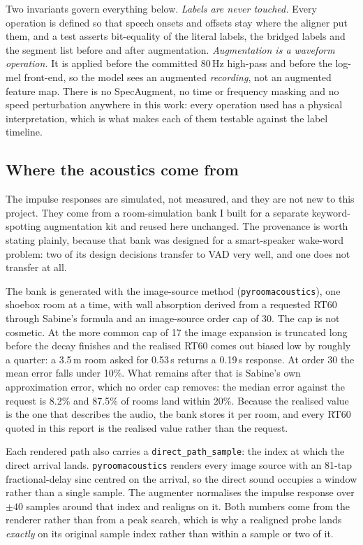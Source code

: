 \documentclass{article}
\begin{document}
Two invariants govern everything below. \emph{Labels are never touched.} Every operation is defined so that speech onsets and offsets stay where the aligner put them, and a test asserts bit-equality of the literal labels, the bridged labels and the segment list before and after augmentation. \emph{Augmentation is a waveform operation.} It is applied before the committed 80\,Hz high-pass and before the log-mel front-end, so the model sees an augmented \emph{recording}, not an augmented feature map. There is no SpecAugment, no time or frequency masking and no speed perturbation anywhere in this work: every operation used has a physical interpretation, which is what makes each of them testable against the label timeline.

\subsection{Where the acoustics come from}

The impulse responses are simulated, not measured, and they are not new to this project. They come from a room-simulation bank I built for a separate keyword-spotting augmentation kit and reused here unchanged. The provenance is worth stating plainly, because that bank was designed for a smart-speaker wake-word problem: two of its design decisions transfer to VAD very well, and one does not transfer at all.

The bank is generated with the image-source method (\texttt{pyroomacoustics}), one shoebox room at a time, with wall absorption derived from a requested RT60 through Sabine's formula and an image-source order cap of 30. The cap is not cosmetic. At the more common cap of 17 the image expansion is truncated long before the decay finishes and the realised RT60 comes out biased low by roughly a quarter: a 3.5\,m room asked for 0.53\,s returns a 0.19\,s response. At order 30 the mean error falls under 10\%. What remains after that is Sabine's own approximation error, which no order cap removes: the median error against the request is 8.2\% and 87.5\% of rooms land within 20\%. Because the realised value is the one that describes the audio, the bank stores it per room, and every RT60 quoted in this report is the realised value rather than the request.

Each rendered path also carries a \texttt{direct\_path\_sample}: the index at which the direct arrival lands. \texttt{pyroomacoustics} renders every image source with an 81-tap fractional-delay sinc centred on the arrival, so the direct sound occupies a window rather than a single sample. The augmenter normalises the impulse response over $\pm 40$ samples around that index and realigns on it. Both numbers come from the renderer rather than from a peak search, which is why a realigned probe lands \emph{exactly} on its original sample index rather than within a sample or two of it.
\end{document}
